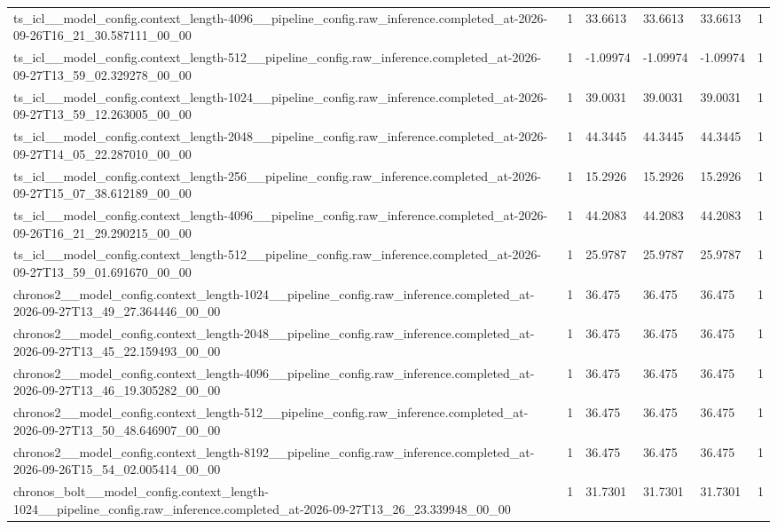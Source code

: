 \begin{tabular}{llllll}
ts\_icl\_\_model\_config.context\_length-4096\_\_pipeline\_config.raw\_inference.completed\_at-2026-09-26T16\_21\_30.587111\_00\_00 & 1 & 33.6613 & 33.6613 & 33.6613 & 1 \\
ts\_icl\_\_model\_config.context\_length-512\_\_pipeline\_config.raw\_inference.completed\_at-2026-09-27T13\_59\_02.329278\_00\_00 & 1 & -1.09974 & -1.09974 & -1.09974 & 1 \\
ts\_icl\_\_model\_config.context\_length-1024\_\_pipeline\_config.raw\_inference.completed\_at-2026-09-27T13\_59\_12.263005\_00\_00 & 1 & 39.0031 & 39.0031 & 39.0031 & 1 \\
ts\_icl\_\_model\_config.context\_length-2048\_\_pipeline\_config.raw\_inference.completed\_at-2026-09-27T14\_05\_22.287010\_00\_00 & 1 & 44.3445 & 44.3445 & 44.3445 & 1 \\
ts\_icl\_\_model\_config.context\_length-256\_\_pipeline\_config.raw\_inference.completed\_at-2026-09-27T15\_07\_38.612189\_00\_00 & 1 & 15.2926 & 15.2926 & 15.2926 & 1 \\
ts\_icl\_\_model\_config.context\_length-4096\_\_pipeline\_config.raw\_inference.completed\_at-2026-09-26T16\_21\_29.290215\_00\_00 & 1 & 44.2083 & 44.2083 & 44.2083 & 1 \\
ts\_icl\_\_model\_config.context\_length-512\_\_pipeline\_config.raw\_inference.completed\_at-2026-09-27T13\_59\_01.691670\_00\_00 & 1 & 25.9787 & 25.9787 & 25.9787 & 1 \\
chronos2\_\_model\_config.context\_length-1024\_\_pipeline\_config.raw\_inference.completed\_at-2026-09-27T13\_49\_27.364446\_00\_00 & 1 & 36.475 & 36.475 & 36.475 & 1 \\
chronos2\_\_model\_config.context\_length-2048\_\_pipeline\_config.raw\_inference.completed\_at-2026-09-27T13\_45\_22.159493\_00\_00 & 1 & 36.475 & 36.475 & 36.475 & 1 \\
chronos2\_\_model\_config.context\_length-4096\_\_pipeline\_config.raw\_inference.completed\_at-2026-09-27T13\_46\_19.305282\_00\_00 & 1 & 36.475 & 36.475 & 36.475 & 1 \\
chronos2\_\_model\_config.context\_length-512\_\_pipeline\_config.raw\_inference.completed\_at-2026-09-27T13\_50\_48.646907\_00\_00 & 1 & 36.475 & 36.475 & 36.475 & 1 \\
chronos2\_\_model\_config.context\_length-8192\_\_pipeline\_config.raw\_inference.completed\_at-2026-09-26T15\_54\_02.005414\_00\_00 & 1 & 36.475 & 36.475 & 36.475 & 1 \\
chronos\_bolt\_\_model\_config.context\_length-1024\_\_pipeline\_config.raw\_inference.completed\_at-2026-09-27T13\_26\_23.339948\_00\_00 & 1 & 31.7301 & 31.7301 & 31.7301 & 1 \\

\end{tabular}

